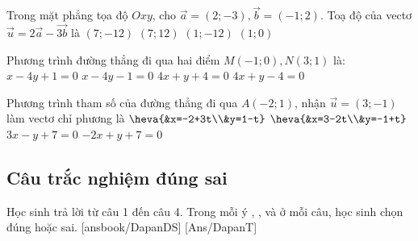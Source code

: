 \begin{ex}%
	Trong mặt phẳng tọa độ $Oxy$, cho $\vec{a}=(2 ;-3), \vec{b}=(-1 ; 2)$. Toạ độ của vectơ $\vec{u}=2 \vec{a}-\vec{3 b}$ là
	\choice
	{\True  $(7 ;-12)$}
	{$(7 ; 12)$}
	{$(1 ;-12)$}
	{$(1 ; 0)$}
\end{ex}
\begin{ex}%
	Phương trình đường thẳng đi qua hai điểm $M(-1 ; 0), N(3 ; 1)$ là:
	\choice
	{\True $x-4 y+1=0$}
	{$x-4 y-1=0$}
	{$4 x+y+4=0$}
	{$4 x+y-4=0$}
\end{ex}
\begin{ex}%
	Phương trình tham số của đường thẳng đi qua $A(-2 ; 1)$, nhận $\vec{u}=(3 ;-1)$ làm vectơ chỉ phương là
	\choice
	{\True $\heva{&x=-2+3t\\&y=1-t}$}
	{$\heva{&x=3-2t\\&y=-1+t}$}
	{$3x-y+7=0$}
	{$-2x+y+7=0$}
\end{ex}


\setcounter{subsection}{1}
\subsection{Câu trắc nghiệm đúng sai}
Học sinh trả lời từ câu 1 đến câu 4.
Trong mỗi ý , ,  và  ở mỗi câu, học sinh chọn đúng hoặc sai.
\setcounter{ex}{0}
\LGexTF
{}[ansbook/DapanDS]
[Ans/DapanT]

